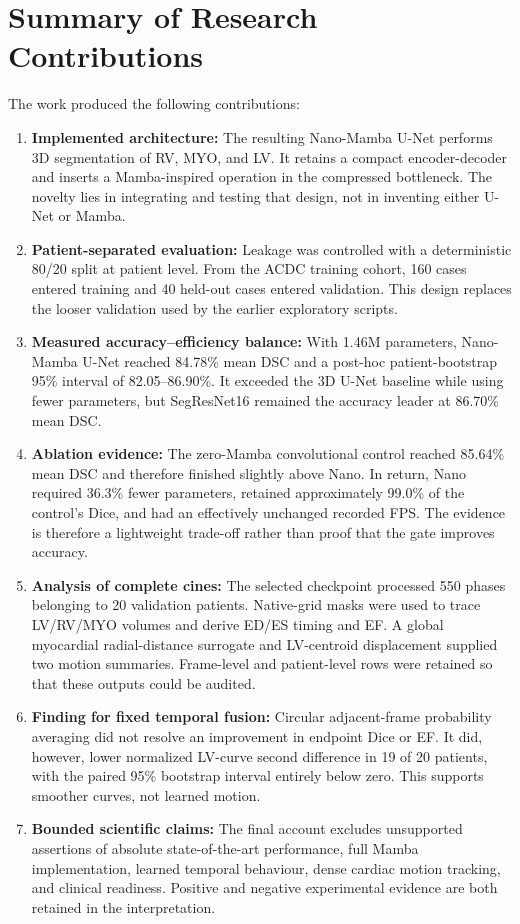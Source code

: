 \section{Summary of Research Contributions}
The work produced the following contributions:
\begin{enumerate}
    \item \textbf{Implemented architecture:} The resulting Nano-Mamba U-Net performs 3D segmentation of RV, MYO, and LV. It retains a compact encoder-decoder and inserts a Mamba-inspired operation in the compressed bottleneck. The novelty lies in integrating and testing that design, not in inventing either U-Net or Mamba.
    \item \textbf{Patient-separated evaluation:} Leakage was controlled with a deterministic 80/20 split at patient level. From the ACDC training cohort, 160 cases entered training and 40 held-out cases entered validation. This design replaces the looser validation used by the earlier exploratory scripts.
    \item \textbf{Measured accuracy--efficiency balance:} With 1.46M parameters, Nano-Mamba U-Net reached 84.78\% mean DSC and a post-hoc patient-bootstrap 95\% interval of 82.05--86.90\%. It exceeded the 3D U-Net baseline while using fewer parameters, but SegResNet16 remained the accuracy leader at 86.70\% mean DSC.
    \item \textbf{Ablation evidence:} The zero-Mamba convolutional control reached 85.64\% mean DSC and therefore finished slightly above Nano. In return, Nano required 36.3\% fewer parameters, retained approximately 99.0\% of the control's Dice, and had an effectively unchanged recorded FPS. The evidence is therefore a lightweight trade-off rather than proof that the gate improves accuracy.
    \item \textbf{Analysis of complete cines:} The selected checkpoint processed 550 phases belonging to 20 validation patients. Native-grid masks were used to trace LV/RV/MYO volumes and derive ED/ES timing and EF. A global myocardial radial-distance surrogate and LV-centroid displacement supplied two motion summaries. Frame-level and patient-level rows were retained so that these outputs could be audited.
    \item \textbf{Finding for fixed temporal fusion:} Circular adjacent-frame probability averaging did not resolve an improvement in endpoint Dice or EF. It did, however, lower normalized LV-curve second difference in 19 of 20 patients, with the paired 95\% bootstrap interval entirely below zero. This supports smoother curves, not learned motion.
    \item \textbf{Bounded scientific claims:} The final account excludes unsupported assertions of absolute state-of-the-art performance, full Mamba implementation, learned temporal behaviour, dense cardiac motion tracking, and clinical readiness. Positive and negative experimental evidence are both retained in the interpretation.
\end{enumerate}


